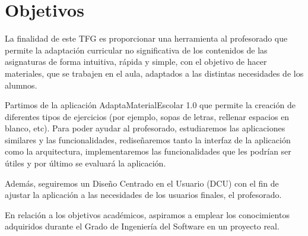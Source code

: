 \section{Objetivos}\label{cap:objetivos}
La finalidad de este TFG es proporcionar una herramienta al profesorado que permite la adaptación curricular no significativa de los contenidos de las asignaturas de forma intuitiva, rápida y simple, con el objetivo de hacer materiales, que se trabajen en el aula, adaptados a las distintas necesidades de los alumnos.

Partimos de la aplicación AdaptaMaterialEscolar 1.0  que permite la creación de diferentes tipos de ejercicios (por ejemplo, sopas de letras, rellenar espacios en blanco, etc). Para poder ayudar al profesorado, estudiaremos las aplicaciones similares y las funcionalidades, rediseñaremos tanto la interfaz de la aplicación como la arquitectura, implementaremos las funcionalidades que les podrían ser útiles y por último se evaluará la aplicación.

Además, seguiremos un Diseño Centrado en el
Usuario (DCU) con el fin de ajustar la aplicación a las necesidades de los usuarios finales, el profesorado.
 
En relación a los objetivos académicos, aspiramos a emplear los conocimientos adquiridos durante el Grado de Ingeniería del Software en un proyecto real.



